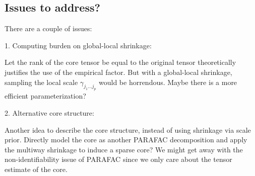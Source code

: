\documentclass[10pt]{article}
\begin{document}
\subsection{Issues to address?}

There are a couple of issues:

1. Computing burden on global-local shrinkage:

Let the rank of the core tensor be equal to the original tensor theoretically justifies the use of the empirical factor. But with a global-local shrinkage, sampling the local scale $\gamma_{j_1\ldots j_p}$ would be horrendous. Maybe there is a more efficient parameterization?

2. Alternative core structure:

Another idea to describe the core structure, instead of using shrinkage via scale prior. Directly model the core as another PARAFAC decomposition and apply the multiway shrinkage to induce a sparse core? We might get away with the non-identifiability issue of PARAFAC since we only care about the tensor estimate of the core.
\end{document}
